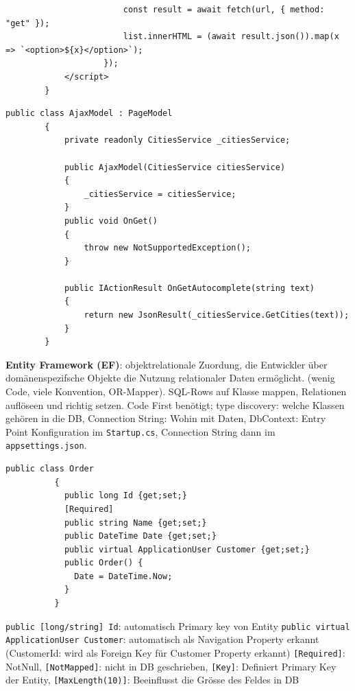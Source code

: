 \documentclass[10pt,landscape]{article}
\begin{document}
\begin{multicols}{2}
\begin{lstlisting}
                        const result = await fetch(url, { method: "get" });
                        list.innerHTML = (await result.json()).map(x => `<option>${x}</option>`);
                    });
            </script>
        }
        \end{lstlisting}\begin{lstlisting}[style=CSharp]
        public class AjaxModel : PageModel
        {
            private readonly CitiesService _citiesService;

            public AjaxModel(CitiesService citiesService)
            {
                _citiesService = citiesService;
            }
            public void OnGet()
            {
                throw new NotSupportedException();
            }

            public IActionResult OnGetAutocomplete(string text)
            {
                return new JsonResult(_citiesService.GetCities(text));
            }
        }
        \end{lstlisting}

        \textbf{Entity Framework (EF)}: objektrelationale Zuordung, die Entwickler über domänenspezifsche Objekte die Nutzung relationaler Daten ermöglicht. (wenig Code, viele Konvention, OR-Mapper). SQL-Rows auf Klasse mappen, Relationen auflöseen und richtig setzen.
        Code First benötigt; type discovery: welche Klassen gehören in die DB, Connection String: Wohin mit Daten, DbContext: Entry Point
        Konfiguration im \lstinline{Startup.cs}, Connection String dann im \lstinline{appsettings.json}.

        \begin{lstlisting}[style=CSharp]
          public class Order
          {
            public long Id {get;set;}
            [Required]
            public string Name {get;set;}
            public DateTime Date {get;set;}
            public virtual ApplicationUser Customer {get;set;}
            public Order() {
              Date = DateTime.Now;
            }
          }
        \end{lstlisting}

        \lstinline{public [long/string] Id}: automatisch Primary key von Entity
        \lstinline{public virtual ApplicationUser Customer}: automatisch als Navigation Property erkannt (CustomerId: wird als Foreign Key für Customer Property erkannt)
        \lstinline{[Required]}: NotNull, \lstinline{[NotMapped]}: nicht in DB geschrieben, \lstinline{[Key]}: Definiert Primary Key der Entity, \lstinline{[MaxLength(10)]}: Beeinflusst die Grösse des Feldes in DB


\end{multicols}
\end{document}
